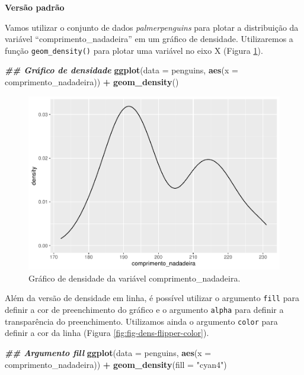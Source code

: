 \documentclass[
]{article}
\newenvironment{Shaded}{\begin{snugshade}}{\end{snugshade}}
\newcommand{\AttributeTok}[1]{\textcolor[rgb]{0.13,0.29,0.53}{#1}}
\newcommand{\DocumentationTok}[1]{\textcolor[rgb]{0.56,0.35,0.01}{\textbf{\textit{#1}}}}
\newcommand{\FunctionTok}[1]{\textcolor[rgb]{0.13,0.29,0.53}{\textbf{#1}}}
\newcommand{\NormalTok}[1]{#1}
\newcommand{\SpecialCharTok}[1]{\textcolor[rgb]{0.81,0.36,0.00}{\textbf{#1}}}
\newcommand{\StringTok}[1]{\textcolor[rgb]{0.31,0.60,0.02}{#1}}
\begin{document}
\textbf{Versão padrão}

Vamos utilizar o conjunto de dados \emph{palmerpenguins} para plotar a distribuição da variável ``comprimento\_nadadeira'' em um gráfico de densidade. Utilizaremos a função \texttt{geom\_density()} para plotar uma variável no eixo X (Figura \ref{fig:fig-dens-flipper}).

\begin{Shaded}
\begin{Highlighting}[]
\DocumentationTok{\#\# Gráfico de densidade}
\FunctionTok{ggplot}\NormalTok{(}\AttributeTok{data =}\NormalTok{ penguins, }\FunctionTok{aes}\NormalTok{(}\AttributeTok{x =}\NormalTok{ comprimento\_nadadeira)) }\SpecialCharTok{+}
    \FunctionTok{geom\_density}\NormalTok{()}
\end{Highlighting}
\end{Shaded}

\begin{figure}
\includegraphics[width=0.75\linewidth,height=0.75\textheight]{epr_files/figure-latex/fig-dens-flipper-1} \caption{Gráfico de densidade da variável comprimento_nadadeira.}\label{fig:fig-dens-flipper}
\end{figure}

Além da versão de densidade em linha, é possível utilizar o argumento \texttt{fill} para definir a cor de preenchimento do gráfico e o argumento \texttt{alpha} para definir a transparência do preenchimento. Utilizamos ainda o argumento \texttt{color} para definir a cor da linha (Figura \ref{fig:fig-dens-flipper-color}).

\begin{Shaded}
\begin{Highlighting}[]
\DocumentationTok{\#\# Argumento fill}
\FunctionTok{ggplot}\NormalTok{(}\AttributeTok{data =}\NormalTok{ penguins, }\FunctionTok{aes}\NormalTok{(}\AttributeTok{x =}\NormalTok{ comprimento\_nadadeira)) }\SpecialCharTok{+}
    \FunctionTok{geom\_density}\NormalTok{(}\AttributeTok{fill =} \StringTok{"cyan4"}\NormalTok{)}
\end{Highlighting}
\end{Shaded}
\end{document}
